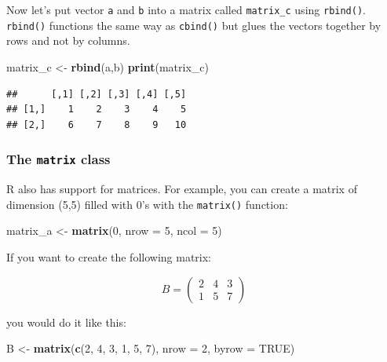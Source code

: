 \documentclass[]{gitbook}
\newenvironment{Shaded}{\begin{snugshade}}{\end{snugshade}}
\newcommand{\DataTypeTok}[1]{\textcolor[rgb]{0.13,0.29,0.53}{#1}}
\newcommand{\DecValTok}[1]{\textcolor[rgb]{0.00,0.00,0.81}{#1}}
\newcommand{\KeywordTok}[1]{\textcolor[rgb]{0.13,0.29,0.53}{\textbf{#1}}}
\newcommand{\NormalTok}[1]{#1}
\newcommand{\OtherTok}[1]{\textcolor[rgb]{0.56,0.35,0.01}{#1}}
\newcommand{\StringTok}[1]{\textcolor[rgb]{0.31,0.60,0.02}{#1}}
\begin{document}
Now let's put vector \texttt{a} and \texttt{b} into a matrix called \texttt{matrix\_c} using \texttt{rbind()}.
\texttt{rbind()} functions the same way as \texttt{cbind()} but glues the vectors together by rows and not by columns.

\begin{Shaded}
\begin{Highlighting}[]
\NormalTok{matrix_c <-}\StringTok{ }\KeywordTok{rbind}\NormalTok{(a,b)}
\KeywordTok{print}\NormalTok{(matrix_c)}
\end{Highlighting}
\end{Shaded}

\begin{verbatim}
##      [,1] [,2] [,3] [,4] [,5]
## [1,]    1    2    3    4    5
## [2,]    6    7    8    9   10
\end{verbatim}

\hypertarget{the-matrix-class}{%
\subsubsection{\texorpdfstring{The \texttt{matrix} class}{The matrix class}}\label{the-matrix-class}}

R also has support for matrices. For example, you can create a matrix of dimension (5,5) filled
with 0's with the \texttt{matrix()} function:

\begin{Shaded}
\begin{Highlighting}[]
\NormalTok{matrix_a <-}\StringTok{ }\KeywordTok{matrix}\NormalTok{(}\DecValTok{0}\NormalTok{, }\DataTypeTok{nrow =} \DecValTok{5}\NormalTok{, }\DataTypeTok{ncol =} \DecValTok{5}\NormalTok{)}
\end{Highlighting}
\end{Shaded}

If you want to create the following matrix:

\[
B = \left(
\begin{array}{ccc}
 2 & 4 & 3 \\
 1 & 5 & 7
\end{array} \right)
\]

you would do it like this:

\begin{Shaded}
\begin{Highlighting}[]
\NormalTok{B <-}\StringTok{ }\KeywordTok{matrix}\NormalTok{(}\KeywordTok{c}\NormalTok{(}\DecValTok{2}\NormalTok{, }\DecValTok{4}\NormalTok{, }\DecValTok{3}\NormalTok{, }\DecValTok{1}\NormalTok{, }\DecValTok{5}\NormalTok{, }\DecValTok{7}\NormalTok{), }\DataTypeTok{nrow =} \DecValTok{2}\NormalTok{, }\DataTypeTok{byrow =} \OtherTok{TRUE}\NormalTok{)}
\end{Highlighting}
\end{Shaded}
\end{document}
